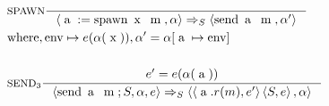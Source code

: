 \begin{align*}
&\inference[$\text{SPAWN}$]{}
                       {\Braket{\Ta := \Tspawn \Tx \Tm,\alpha} \Rightarrow_S \Braket{\Tsend \Ta \Tm,\alpha'}}
\\
&												{\Twhere, \Ten \mapsto e(\alpha(\Tx)), \alpha' = \alpha[\Ta \mapsto \Ten]}
\\\\
&\inference[$\text{SEND}_3$]{e' = e(\alpha(\Ta))}
                       {\Braket{\Tsend \Ta \Tm ; S,\alpha,e} \Rightarrow_S \Braket{\Braket{\Ta.r(m),e'}\Braket{S,e},\alpha}}
\end{align*}
